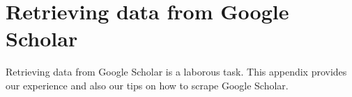 \pagebreak
\section{Retrieving data from Google Scholar}
\label{sec:googlescholar}

Retrieving data from Google Scholar is a laborous task.
This appendix provides our experience and also our tips on how to scrape Google Scholar.
